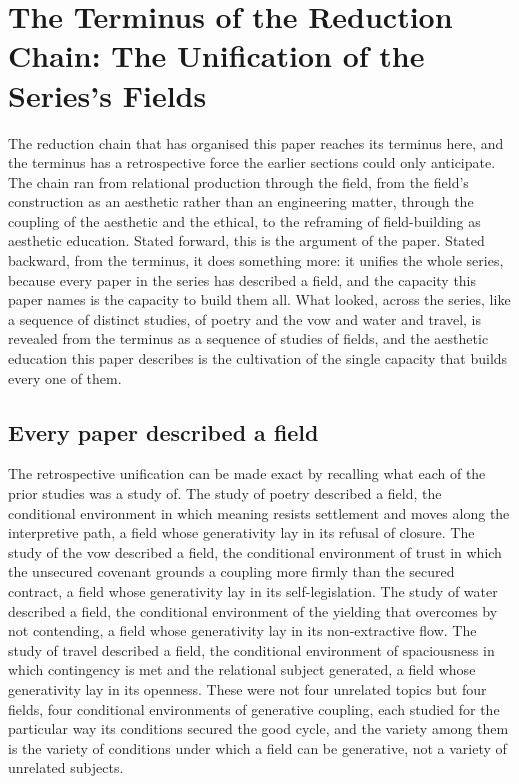 \section{The Terminus of the Reduction Chain: The Unification of the Series's Fields}
\label{p22:sec:terminus}

\noindent
The reduction chain that has organised this paper reaches its terminus here, and the terminus has a retrospective force the earlier sections could only anticipate. The chain ran from relational production through the field, from the field's construction as an aesthetic rather than an engineering matter, through the coupling of the aesthetic and the ethical, to the reframing of field-building as aesthetic education. Stated forward, this is the argument of the paper. Stated backward, from the terminus, it does something more: it unifies the whole series, because every paper in the series has described a field, and the capacity this paper names is the capacity to build them all. What looked, across the series, like a sequence of distinct studies, of poetry and the vow and water and travel, is revealed from the terminus as a sequence of studies of fields, and the aesthetic education this paper describes is the cultivation of the single capacity that builds every one of them.

\subsection{Every paper described a field}
\label{p22:sub:terminus-every-field}

The retrospective unification can be made exact by recalling what each of the prior studies was a study of. The study of poetry described a field, the conditional environment in which meaning resists settlement and moves along the interpretive path, a field whose generativity lay in its refusal of closure. The study of the vow described a field, the conditional environment of trust in which the unsecured covenant grounds a coupling more firmly than the secured contract, a field whose generativity lay in its self-legislation. The study of water described a field, the conditional environment of the yielding that overcomes by not contending, a field whose generativity lay in its non-extractive flow. The study of travel described a field, the conditional environment of spaciousness in which contingency is met and the relational subject generated, a field whose generativity lay in its openness. These were not four unrelated topics but four fields, four conditional environments of generative coupling, each studied for the particular way its conditions secured the good cycle, and the variety among them is the variety of conditions under which a field can be generative, not a variety of unrelated subjects.

